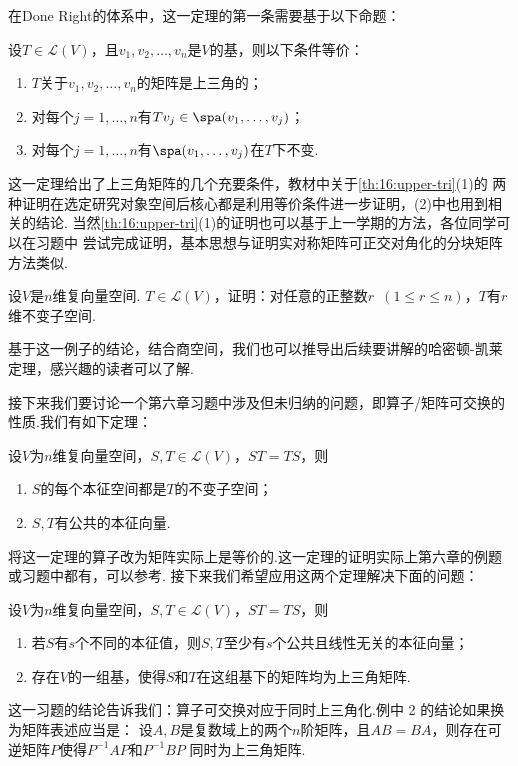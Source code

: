 在Done Right的体系中，这一定理的第一条需要基于以下命题：
\begin{theorem}
    设$T\in \mathcal{L}(V)$，且$v_1,v_2,\ldots,v_n$是$V$的基，则以下条件等价：
    \begin{enumerate}
        \item $T$关于$v_1,v_2,\ldots,v_n$的矩阵是上三角的；

        \item 对每个$j=1,\ldots,n$有$Tv_j\in\spa(v_1,\ldots,v_j)$；

        \item 对每个$j=1,\ldots,n$有$\spa(v_1,\ldots,v_j)$在$T$下不变.
    \end{enumerate}
\end{theorem}
这一定理给出了上三角矩阵的几个充要条件，教材中关于\autoref{th:16:upper-tri}(1)的
两种证明在选定研究对象空间后核心都是利用等价条件进一步证明，(2)中也用到相关的结论.
当然\autoref{th:16:upper-tri}(1)的证明也可以基于上一学期的方法，各位同学可以在习题中
尝试完成证明，基本思想与证明实对称矩阵可正交对角化的分块矩阵方法类似.
\begin{example}
    设$V$是$n$维复向量空间. $T\in \mathcal{L}(V)$，证明：对任意的正整数$r\enspace(1\leqslant r\leqslant n)$，$T$有$r$维不变子空间.
\end{example}
基于这一例子的结论，结合商空间，我们也可以推导出后续要讲解的哈密顿-凯莱定理，感兴趣的读者可以了解.

接下来我们要讨论一个第六章习题中涉及但未归纳的问题，即算子/矩阵可交换的性质.我们有如下定理：
\begin{theorem}
    设$V$为$n$维复向量空间，$S,T\in \mathcal{L}(V)$，$ST=TS$，则
    \begin{enumerate}
        \item $S$的每个本征空间都是$T$的不变子空间；

        \item $S,T$有公共的本征向量.
    \end{enumerate}
\end{theorem}
将这一定理的算子改为矩阵实际上是等价的.这一定理的证明实际上第六章的例题或习题中都有，可以参考.
接下来我们希望应用这两个定理解决下面的问题：
\begin{example}
    设$V$为$n$维复向量空间，$S,T\in \mathcal{L}(V)$，$ST=TS$，则
    \begin{enumerate}
        \item 若$S$有$s$个不同的本征值，则$S,T$至少有$s$个公共且线性无关的本征向量；

        \item 存在$V$的一组基，使得$S$和$T$在这组基下的矩阵均为上三角矩阵.
    \end{enumerate}
\end{example}
这一习题的结论告诉我们：算子可交换对应于同时上三角化.例中 2 的结论如果换为矩阵表述应当是：
设$A,B$是复数域上的两个$n$阶矩阵，且$AB=BA$，则存在可逆矩阵$P$使得$P^{-1}AP$和$P^{-1}BP$
同时为上三角矩阵.

